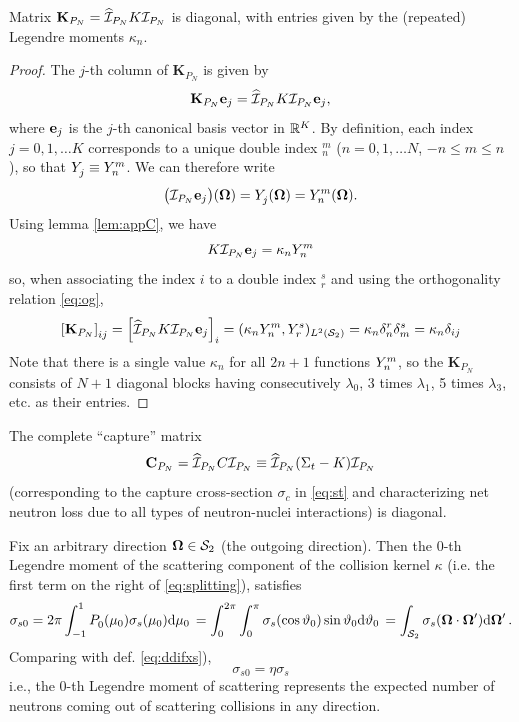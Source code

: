 \begin{corollary}
	Matrix $\mathbf{K}_{P_N} = \PihPN K \PiPN$ is diagonal, with entries given by the (repeated) Legendre moments $\kappa_n$.
\end{corollary}
\begin{proof}
	The $j$-th column of $\mathbf{K}_{P_N}$ is given by
	$$
		\mathbf{K}_{P_N}\mat{e}_j = \PihPN K \PiPN \mat{e}_j,
	$$
	where $\mat{e}_j$ is the $j$-th canonical basis vector in $\R[K]$. By definition, each index \mbox{$j = 0,1,\ldots K$}
	corresponds to a unique double index ${}_n^m$ ($n = 0,1,\ldots N$, $-n \leq m \leq n$), so that $\Y{j}{} \equiv
	\Y{n}{m}$.
	We can therefore write 
	$$
		\bigl(\PiPN \mat{e}_j\bigr)(\bomega) = \Y{j}{}(\bomega) = Y_n^m(\bomega).
	$$
	Using lemma \ref{lem:appC}, we have 
	$$
		K \PiPN \mat{e}_j = \kappa_n \Y{n}{m}
	$$
	so, when associating the index $i$ to a double index ${}_r^s$ and using the orthogonality relation \eqref{eq:og},
	$$
	\left[\mathbf{K}_{P_N}\right]_{ij} = \left[\PihPN K \PiPN \mat{e}_j\right]_i = (\kappa_n \Y{n}{m},
		\Y{r}{s})_{\Lp[2](\Sphere)} = \kappa_n\delta_{n}^{r}\delta_{m}^{s} = \kappa_n\kron{i}{j}
	$$
	Note that there is a single value $\kappa_n$ for all $2n + 1$ functions  $\Y{n}{m}$, so the $\mathbf{K}_{P_N}$ consists of
	$N+1$ diagonal blocks having consecutively $\lambda_0$, 3 times $\lambda_1$, 5 times $\lambda_3$, etc.  as their
	entries.
\end{proof}
\begin{corollary}
The complete ``capture'' matrix 
$$
	\mat{C}_{P_N} = \PihPN C \PiPN \equiv \PihPN (\Sigma_t - K) \PiPN 
$$
(corresponding to the capture cross-section $\sigma_c$ in \eqref{eq:st} and characterizing net neutron loss due to
all types of neutron-nuclei interactions) is diagonal.
\end{corollary}
\vspace*{1em}
\begin{remark}\label{rem:app:c}
	Fix an arbitrary direction $\bomega\in\Sphere$ (the outgoing direction). Then the $0$-th Legendre moment of the
	scattering component of the collision kernel $\kappa$ (i.e. the first term on the right of \eqref{eq:splitting}), satisfies 
	$$
		\sigma_{s0} = 2\pi \muint[_0]{\P{0}{}(\mu_0)\sigma_s(\mu_0)} = \int_{0}^{2\pi} \int_{0}^{\pi}
		\sigma_s(\cos \polar_0) \sin \polar_0\d{\polar_0} = 
		\int_{\Sphere} \sigma_s(\bomega\cdot\bomega') \d{\bomega'}.
	$$
	Comparing with def. \eqref{eq:ddifxs}), 
	$$
		\sigma_{s0} = \eta\sigma_s
	$$
	i.e., the $0$-th Legendre moment of scattering represents the expected number of neutrons coming out of 
	scattering collisions in any direction.
\end{remark} 

